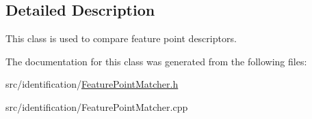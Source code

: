 \subsection{Detailed Description}
This class is used to compare feature point descriptors. 

The documentation for this class was generated from the following files\+:\begin{DoxyCompactItemize}
\item 
src/identification/\mbox{\hyperlink{_feature_point_matcher_8h}{Feature\+Point\+Matcher.\+h}}\item 
src/identification/Feature\+Point\+Matcher.\+cpp\end{DoxyCompactItemize}
